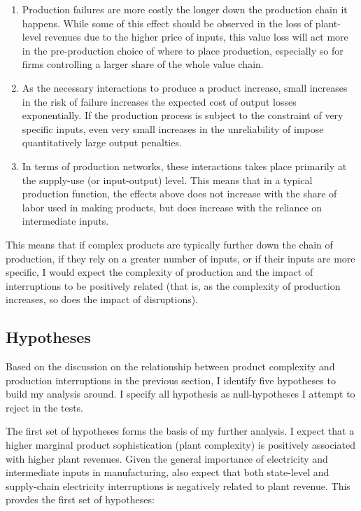 \documentclass[11pt]{article}
\begin{document}
\begin{enumerate}

\item Production failures are more costly the longer down the production chain it happens. While some of this effect should be observed in the loss of plant-level revenues due to the higher price of inputs, this value loss will act more in the pre-production choice of where to place production, especially so for firms controlling a larger share of the whole value chain.

\item As the necessary interactions to produce a product increase, small increases in the risk of failure increases the expected cost of output losses exponentially. If the production process is subject to the constraint of very specific inputs, even very small increases in the unreliability of impose quantitatively large output penalties.

\item In terms of production networks, these interactions takes place primarily at the supply-use (or input-output) level. This means that in a typical production function, the effects above does not increase with the share of labor used in making products, but does increase with the reliance on intermediate inputs.

\end{enumerate}

This means that if complex products are typically further down the chain of production, if they rely on a greater number of inputs, or if their inputs are more specific, I would expect the complexity of production and the impact of interruptions to be positively related (that is, as the complexity of production increases, so does the impact of disruptions). 


\subsection{Hypotheses}
\label{sub:hyp}
Based on the discussion on the relationship between product complexity and production interruptions in the previous section, I identify five hypotheses to build my analysis around. I specify all hypothesis as null-hypotheses I attempt to reject in the tests. 

The first set of hypotheses forms the basis of my further analysis. I expect that a higher marginal product sophistication (plant complexity) is positively associated with higher plant revenues. Given the general importance of electricity and intermediate inputs in manufacturing, also expect that both state-level and supply-chain electricity interruptions is negatively related to plant revenue. This provdes the first set of hypotheses:
\end{document}
